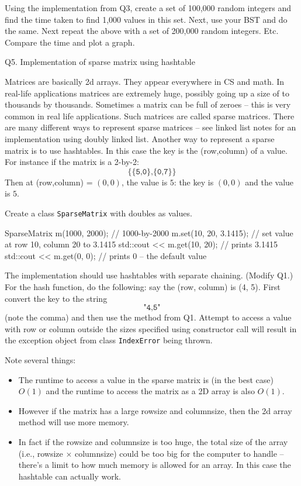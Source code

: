 Using the implementation from Q3, create a set of 100,000 random integers
and find the time taken to find 1,000 values in this set.
Next, use your BST and do the same.
Next repeat the above with
a set of 200,000 random integers.
Etc.
Compare the time and plot a graph.




\newpage
Q5. Implementation of sparse matrix using hashtable

Matrices are basically 2d arrays.
They appear everywhere in CS and math.
In real-life applications matrices are extremely huge, possibly
going up a size of to thousands by thousands.
Sometimes a matrix can be full of zeroes -- this is very common in
real life applications.
Such matrices are called sparse matrices.
There are many different ways to represent sparse matrices -- see
linked list notes for an implementation using doubly linked list.
Another way to represent a sparse matrix is to use hashtables.
In this case the key is the (row,column) of a value.
For instance if the matrix is a 2-by-2:
\[
\texttt{\{\{5,0\},\{0,7\}\}}
\]
Then at (row,column) = $(0,0)$, the value is $5$:
the key is $(0,0)$ and the
value is $5$.

Create a class \texttt{SparseMatrix} with doubles as values.
\begin{console}
SparseMatrix m(1000, 2000); // 1000-by-2000
m.set(10, 20, 3.1415);      // set value at row 10, column 20 to 3.1415
std::cout << m.get(10, 20); // prints 3.1415
std::cout << m.get(0, 0);   // prints 0 -- the default value
\end{console}
The implementation should use hashtables with separate chaining.
(Modify Q1.)
For the hash function, do the following:
say the (row, column) is (4, 5). First convert the key to the string
\[
\texttt{"4,5"}
\]
(note the comma) and then use the method from Q1.
Attempt to access a value with row or column outside the sizes
specified using constructor call will result in 
the exception object from class \texttt{IndexError} being thrown.

Note several things:
\begin{itemize}
  \item The runtime to access a value in the sparse matrix is
  (in the best case) $O(1)$ and the runtime to access the matrix as a
  2D array is also $O(1)$.
  \item 
  However if the matrix has a large rowsize and columnsize, then
  the 2d array method will use more memory.
  \item In fact if the rowsize and columnsize is too huge, the
  total size of the array (i.e., rowsize $\times$ columnsize)
  could be too big for the computer to handle -- there's a limit
  to how much memory is allowed for an array.
  In this case the hashtable can actually work.
\end{itemize}




